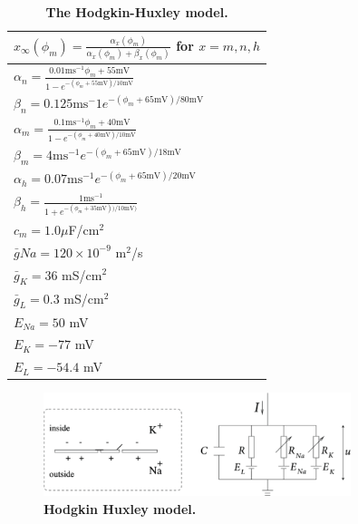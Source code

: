 \begin{table}[h!]
    \caption{\textbf{The Hodgkin-Huxley model.}}
    \label{tab:HH}
\begin{center}
    \begin{tabular}{l}
    \hline
    $x_{\infty}(\phi_m) = \frac{\alpha_x(\phi_m)}{\alpha_x(\phi_m) + \beta_x(\phi_m)}$ for $x = m,n,h$ \\ \hline
    $ \alpha_n = \frac{0.01 \mathrm{ms}^{-1} \phi_m+55 \mathrm{mV}}{1-e^{-(\phi_m+55 \mathrm{mV})/10 \mathrm{mV}}}$  \\ \hline
    $ \beta_n = 0.125 \mathrm{ms}^-1 e^{-(\phi_m+65 \mathrm{mV})/80 \mathrm{mV}} $  \\ \hline
    $ \alpha_m = \frac{0.1 \mathrm{ms}^{-1} \phi_m+ 40 \mathrm{mV}} {1-e^{-(\phi_m+40 \mathrm{mV})/10 \mathrm{mV}}}$  \\ \hline
    $\beta_m = 4 \mathrm{ms}^{-1} e^{-(\phi_m+65  \mathrm{mV})/18 \mathrm{mV}} $  \\ \hline
    $\alpha_h = 0.07 \mathrm{ms}^{-1} e^{-(\phi_m+65 \mathrm{mV})/20 \mathrm{mV}}$  \\ \hline
    $\beta_h = \frac{1 \mathrm{ms}^{-1}}{1+e^{-(\phi_m+35 \mathrm{mV}))/10 \mathrm{mV})}} $  \\ \hline
    $c_m = 1.0 \mu $F/cm$^2$ \\ \hline
    $\bar{g}{Na} = 120\times 10^{-9}$ m$^2$/s\\ \hline
    $\bar{g}_{K} = 36$ mS/cm$^2$ \\ \hline
    $\bar{g}_{L} = 0.3$ mS/cm$^2$ \\ \hline
    $E_{Na} = 50$ mV \\ \hline
    $E_{K} = -77$ mV \\ \hline
    $E_{L} = -54.4$ mV \\ \hline
    \end{tabular}
    \end{center}
\end{table}

\begin{figure}[h!]
\begin{center}
\includegraphics[width=0.8\textwidth]{Figures/Neuron/HHmodel.png}
\end{center}
\caption{\textbf{Hodgkin Huxley model.}}
\label{Neuron:fig:HHcircuit}
\end{figure}


